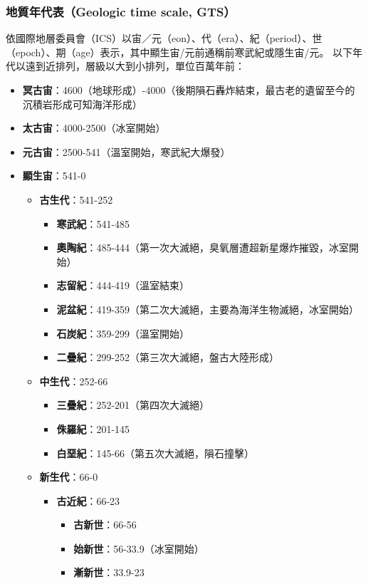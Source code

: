\documentclass[a4paper,12pt]{report}
\begin{document}
\subsubsection{地質年代表（Geologic time scale, GTS）}
依國際地層委員會（ICS）以宙／元（eon）、代（era）、紀（period）、世（epoch）、期（age）表示，其中顯生宙/元前通稱前寒武紀或隱生宙/元。
以下年代以遠到近排列，層級以大到小排列，單位百萬年前：
\begin{itemize}
\item \textbf{冥古宙}：4600（地球形成）-4000（後期隕石轟炸結束，最古老的遺留至今的沉積岩形成可知海洋形成）
\item \textbf{太古宙}：4000-2500（冰室開始）
\item \textbf{元古宙}：2500-541（溫室開始，寒武紀大爆發）
\item \textbf{顯生宙}：541-0
\begin{itemize}
\item \textbf{古生代}：541-252
\begin{itemize}
\item \textbf{寒武紀}：541-485
\item \textbf{奧陶紀}：485-444（第一次大滅絕，臭氧層遭超新星爆炸摧毀，冰室開始）
\item \textbf{志留紀}：444-419（溫室結束）
\item \textbf{泥盆紀}：419-359（第二次大滅絕，主要為海洋生物滅絕，冰室開始）
\item \textbf{石炭紀}：359-299（溫室開始）
\item \textbf{二疊紀}：299-252（第三次大滅絕，盤古大陸形成）
\end{itemize}
\item \textbf{中生代}：252-66
\begin{itemize}
\item \textbf{三疊紀}：252-201（第四次大滅絕）
\item \textbf{侏羅紀}：201-145
\item \textbf{白堊紀}：145-66（第五次大滅絕，隕石撞擊）
\end{itemize}
\item \textbf{新生代}：66-0
\begin{itemize}
\item \textbf{古近紀}：66-23
\begin{itemize}
\item \textbf{古新世}：66-56
\item \textbf{始新世}：56-33.9（冰室開始）
\item \textbf{漸新世}：33.9-23
\end{itemize}

\end{itemize}
\end{itemize}
\end{itemize}
\end{document}
